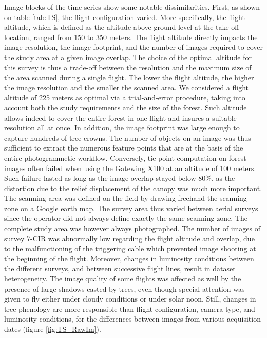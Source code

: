 \documentclass[remotesensing,article,submit,moreauthors,pdftex,12pt,a4paper]{mdpi} %
\begin{document}
Image blocks of the time series show some notable dissimilarities. 
First, as shown on table \ref{tab:TS}, the flight configuration varied. 
More specifically, the flight altitude, which is defined as the altitude above ground level at the take-off location, ranged from 150 to 350 meters. 
The flight altitude directly impacts the image resolution, the image footprint, and the number of images required to cover the study area at a given image overlap. 
The choice of the optimal altitude for this survey is thus a trade-off between the resolution and the maximum size of the area scanned during a single flight. 
The lower the flight altitude, the higher the image resolution and the smaller the scanned area.
We considered a flight altitude of 225 meters as optimal via a trial-and-error procedure, taking into account both the study requirements and the size of the forest.
Such altitude allows indeed to cover the entire forest in one flight and insures a suitable resolution all at once.
In addition, the image footprint was large enough to capture hundreds of tree crowns. 
The number of objects on an image was thus sufficient to extract the numerous feature points that are at the basis of the entire photogrammetic workflow. 
Conversely, tie point computation on forest images often failed when using the Gatewing X100 at an altitude of 100 meters. 
Such failure lasted as long as the image overlap stayed below 80\%, as the distortion due to the relief displacement of the canopy was much more important. 
The scanning area was defined on the field by drawing freehand the scanning zone on a Google earth map. 
The survey area thus varied between aerial surveys since the operator did not always define exactly the same scanning zone. 
The complete study area was however always photographed. 
The number of images of survey 7-CIR was abnormally low regarding the flight altitude and overlap, due to the malfunctioning of the triggering cable which prevented image shooting at the beginning of the flight. 
Moreover, changes in luminosity conditions between the different surveys, and between successive flight lines, result in dataset heterogeneity. 
The image quality of some flights was affected as well by the presence of large shadows casted by trees, even though special attention was given to fly either under cloudy conditions or under solar noon. 
Still, changes in tree phenology are more responsible than flight configuration, camera type, and luminosity conditions, for the differences between images from various acquisition dates (figure \ref{fig:TS_RawIm}).
\end{document}
